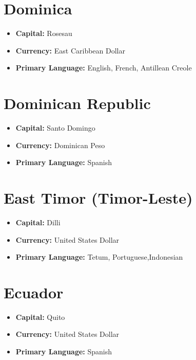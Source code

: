 \documentclass[a4paper,100pt,twoside]{book}
\begin{document}
\section*{\Huge Dominica}
\vspace{5mm} %
\begin{itemize}
	\item \textbf{Capital:} Rosesau
	\item \textbf{Currency:} East Caribbean Dollar
	\item \textbf{Primary Language:} English, French, Antillean Creole
\end{itemize}

\section*{\Huge Dominican Republic}
\vspace{5mm} %
\begin{itemize}
	\item \textbf{Capital:} Santo Domingo
	\item \textbf{Currency:} Dominican Peso
	\item \textbf{Primary Language:} Spanish
\end{itemize}

\section*{\Huge East Timor (Timor-Leste)}
\vspace{5mm} %
\begin{itemize}
	\item \textbf{Capital:} Dilli
	\item \textbf{Currency:} United States Dollar
	\item \textbf{Primary Language:} Tetum, Portuguese,Indonesian
\end{itemize}

\section*{\Huge Ecuador}
\vspace{5mm} %
\begin{itemize}
	\item \textbf{Capital:} Quito
	\item \textbf{Currency:} United States Dollar
	\item \textbf{Primary Language:} Spanish
\end{itemize}
\end{document}

